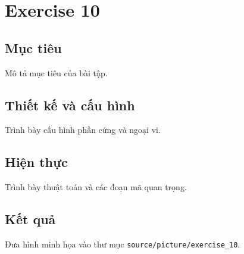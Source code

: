 \chapter{Exercise 10}
\section{Mục tiêu}
Mô tả mục tiêu của bài tập.
\section{Thiết kế và cấu hình}
Trình bày cấu hình phần cứng và ngoại vi.
\section{Hiện thực}
Trình bày thuật toán và các đoạn mã quan trọng.
\section{Kết quả}
Đưa hình minh họa vào thư mục \texttt{source/picture/exercise\_10}.
